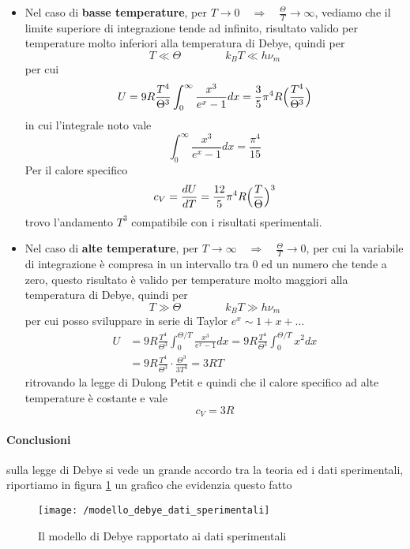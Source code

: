 \begin{itemize}
\item Nel caso di \textbf{basse temperature}, per $T \to 0 \quad\Rightarrow\quad  \frac{\Theta}{T} \to \infty$, vediamo che il limite superiore di integrazione tende ad infinito, risultato valido per temperature molto inferiori alla temperatura di Debye, quindi per
$$T \ll \Theta \quad\quad\quad\quad k_B T \ll h \nu_m$$
per cui
\begin{equation}
U = 9R \frac{T^4}{\Theta^3} \int_0^{\infty} \frac{x^3}{e^x-1} dx
= \frac{3}{5} \pi^4 R \Bigl(  \frac{T^4}{\Theta^3}  \Bigr)
\end{equation}
in cui l'integrale noto vale
$$\int_0^{\infty} \frac{x^3}{e^x-1} dx = \frac{\pi^4}{15}$$
Per il calore specifico
\begin{equation}
c_V = \frac{dU}{dT} = \frac{12}{5} \pi^4 R \Bigl(  \frac{T}{\Theta}  \Bigr)^3
\end{equation}
trovo l'andamento $T^3$ compatibile con i risultati sperimentali.

\item Nel caso di \textbf{alte temperature}, per $T \to \infty \quad\Rightarrow\quad \frac{\Theta}{T} \to 0$, per cui la variabile di integrazione è compresa in un intervallo tra 0 ed un numero che tende a zero, questo risultato è valido per temperature molto maggiori alla temperatura di Debye, quindi per
$$T \gg \Theta \quad\quad\quad\quad k_B T \gg h \nu_m$$
per cui posso sviluppare in serie di Taylor $ e^x \sim 1 + x + ... $
\begin{equation}
\begin{split}
U & = 9R \frac{T^4}{\Theta^3} \int_0^{\Theta/T} \frac{x^3}{e^x-1} dx
= 9R \frac{T^4}{\Theta^3} \int_0^{\Theta/T} x^2 dx \\
& = 9R \frac{T^4}{\Theta^3} \cdot \frac{\Theta^3}{3 T^3}
= 3 R T
\end{split}
\end{equation}
ritrovando la legge di Dulong Petit e quindi che il calore specifico ad alte temperature è costante e vale
\begin{equation}
c_V = 3R
\end{equation}
\end{itemize}

\paragraph{Conclusioni} sulla legge di Debye si vede un grande accordo tra la teoria ed i dati sperimentali, riportiamo in figura \ref{dabye_datispe} un grafico che evidenzia questo fatto
\begin{figure}[h]
\centering
\texttt{[image: /modello\_debye\_dati\_sperimentali]}
\caption{Il modello di Debye rapportato ai dati sperimentali}
\label{dabye_datispe}
\end{figure}


